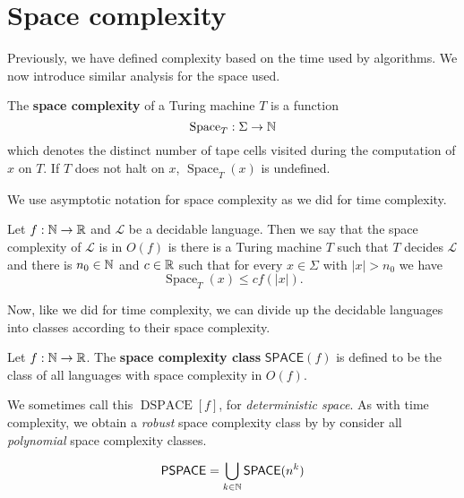 
\section{Space complexity}

Previously, we have defined complexity based on the time used by algorithms.
We now introduce similar analysis for the space used.

\begin{definition}
	The \textbf{space complexity} of a Turing machine $T$
	is a function 
	\[
		\operatorname{Space}_T: \Sigma \to \mathbb{N}
	\]
	which denotes the distinct number of tape cells visited during the 
	computation of $x$ on $T$.
	If $T$ does not halt on $x$, $\operatorname{Space}_T(x)$ is undefined.
\end{definition}


We use asymptotic notation for space complexity as we did for time complexity.

\begin{definition}[]
	Let $f: \mathbb{N} \to \mathbb{R}$ and $\mathcal L$ be a decidable language.
	Then we say that the space complexity of $\mathcal L$ is in $O(f)$
	is there is a Turing machine $T$ such that $T$ decides $\mathcal L$
	and there is $n_0 \in \mathbb{N}$ and $c \in \mathbb{R}$ such that for every
	$x \in \Sigma$ with $\left\lvert x \right\rvert > n_0$ we have
	\[
		\operatorname{Space}_T(x) \leq cf(\left\lvert x \right\rvert).
	\]
\end{definition}

Now, like we did for time complexity, we can divide up the decidable languages into classes according to their space complexity.

\begin{definition}
	Let $f: \mathbb{N} \to \mathbb{R}$.
	The \textbf{space complexity class} $\mathsf{SPACE}(f)$ is defined
	to be the class of all languages with space complexity in $O(f)$.
\end{definition}

We sometimes call this $\operatorname{DSPACE}[f]$, for \emph{deterministic
space}.
As with time complexity, we obtain a \emph{robust} space complexity class by
by consider all \emph{polynomial} space complexity classes.

\begin{definition}
	\[
		\mathsf{PSPACE} = \bigcup_{k \in \mathbb{N}} \mathsf{SPACE}(n^k)
	\]
\end{definition}

